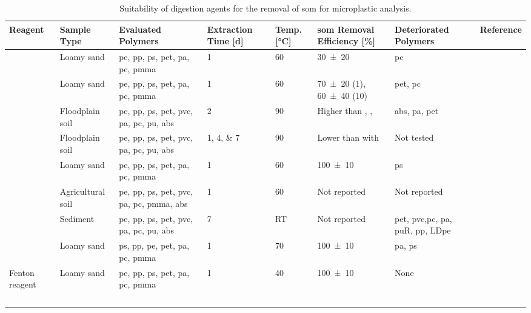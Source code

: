 \begin{table}
	\centering\footnotesize
	\caption{Suitability of digestion agents for the removal of \ac{som} for microplastic analysis.}\label{tab:som-removal}
	\begin{tabulary}{1.0\textwidth}{LLLLLLLL}
		\toprule
		{Reagent} & {Sample Type} & {Evaluated Polymers} & {Extraction Time [\si{\day}]} & {Temp. [\si{\degreeCelsius}]} & {\Ac{som} Removal Efficiency [\si{\percent}]} & {Deteriorated Polymers} & {Reference} \\
		\midrule
		 & Loamy sand & \acs{pe}, \acs{pp}, \acs{ps}, \acs{pet}, \acs{pa}, \acs{pc}, \acs{pmma}  & \num{1} & \num{60} & \num{30(20)} & \acs{pc} & \citet{HurleyValidation2018} \\
		 & Loamy sand & \acs{pe}, \acs{pp}, \acs{ps}, \acs{pet}, \acs{pa}, \acs{pc}, \acs{pmma} & \num{1} & \num{60} & \num{70(20)} (\SI{1}{\Molar}), \num{60(40)} (\SI{10}{\Molar}) & \acs{pet}, \acs{pc} & \citet{HurleyValidation2018} \\
		 & Floodplain soil & \acs{pe}, \acs{pp}, \acs{ps}, \acs{pet}, \acs{pvc}, \acs{pa}, \acs{pc}, \acs{pu}, \acs{abs} & \num{2} & \num{90} & Higher than , ,  & \acs{abs}, \acs{pa}, \acs{pet} & \citet{ScheurerMicroplastics2018} \\
		 & Floodplain soil & \acs{pe}, \acs{pp}, \acs{ps}, \acs{pet}, \acs{pvc}, \acs{pa}, \acs{pc}, \acs{pu}, \acs{abs} & \numlist{1;4;7} & \num{90} & Lower than with  & Not tested & \citet{ScheurerMicroplastics2018} \\
		 & Loamy sand & \acs{pe}, \acs{pp}, \acs{ps}, \acs{pet}, \acs{pa}, \acs{pc}, \acs{pmma} & \num{1} & \num{60} & \num{100(10)} & \acs{ps} & \citet{HurleyValidation2018} \\
		 & Agricultural soil & \acs{pe}, \acs{pp}, \acs{ps}, \acs{pet}, \acs{pvc}, \acs{pa}, \acs{pc}, \acs{pmma}, \acs{abs}  & \num{1} & \num{60} & Not reported & Not reported & \citet{LiuMethod2019} \\
		 & Sediment & \acs{pe}, \acs{pp}, \acs{ps}, \acs{pet}, \acs{pvc}, \acs{pa}, \acs{pc}, \acs{pu}, \acs{abs} & \num{7} & RT & Not reported & \acs{pet}, \acs{pvc},\acs{pc}, \acs{pa}, \acs{pu}R, \acs{pp}, LD\acs{pe} & \citet{NuelleNew2014} \\
		 & Loamy sand & \acs{ps}, \acs{pp}, \acs{pe}, \acs{pet}, \acs{pa}, \acs{pc}, \acs{pmma} & \num{1} & \num{70} & \num{100(10)} & \acs{pa}, \acs{ps} & \citet{HurleyValidation2018}  \\
		Fenton reagent & Loamy sand & \acs{pe}, \acs{pp}, \acs{ps}, \acs{pet}, \acs{pa}, \acs{pc}, \acs{pmma} & \num{1} & \num{40} & \num{100(10)} & None & \citet{HurleyValidation2018} \\
		\bottomrule
		~
	\end{tabulary}
\end{table}

